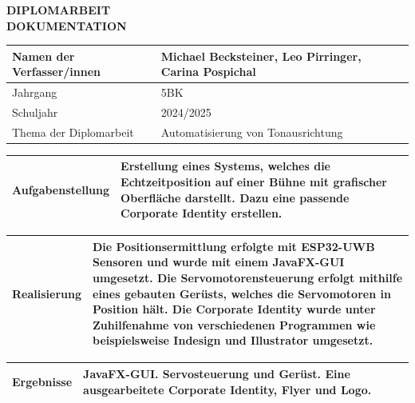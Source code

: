 \begin{center}
 \LARGE \textbf{DIPLOMARBEIT}\\
 \Large \textbf{DOKUMENTATION}\\
 \normalsize
\end{center}


\newlength{\feldC}
\newlength{\feldD}

\linespread{1.1} \normalsize
\begin{tabular}{|p{\feldC}|p{\feldD}|}
 \hline
 Namen der Verfasser/innen & Michael Becksteiner, Leo Pirringer, Carina Pospichal\\ 
 \hline 
 Jahrgang & 5BK \\ Schuljahr & 2024/2025 \\
 \hline
 Thema der Diplomarbeit & Automatisierung von Tonausrichtung\\
 \hline
\end{tabular}

\begin{tabular}{|p{\feldC}|p{\feldD}|}
 \hline
 Aufgabenstellung & Erstellung eines Systems, welches die Echtzeitposition auf einer Bühne mit grafischer Oberfläche darstellt. Dazu eine passende Corporate Identity erstellen. \\
 \hline
\end{tabular}

\begin{tabular}{|p{\feldC}|p{\feldD}|}
 \hline
 Realisierung & Die Positionsermittlung erfolgte mit ESP32-UWB Sensoren und wurde mit einem JavaFX-GUI umgesetzt. Die Servomotorensteuerung erfolgt mithilfe eines gebauten Gerüsts, welches die Servomotoren in Position hält. Die Corporate Identity wurde unter Zuhilfenahme von verschiedenen Programmen wie beispielsweise Indesign und Illustrator umgesetzt.\\
 \hline
\end{tabular}

\begin{tabular}{|p{\feldC}|p{\feldD}|}
 \hline
 Ergebnisse & JavaFX-GUI. Servosteuerung und Gerüst. Eine ausgearbeitete Corporate Identity, Flyer und Logo.\\
 \hline
\end{tabular}

